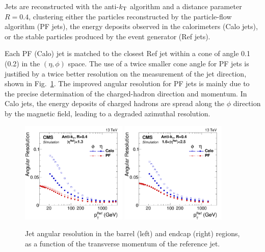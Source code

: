 Jets are reconstructed with the anti-$k_{\mathrm{T}}$ algorithm
\cite{antikt,fastjet} and a distance parameter $R=0.4$, clustering either the particles reconstructed by the
particle-flow algorithm (PF jets), the energy deposits observed in the
calorimeters (Calo jets), or the stable particles produced by the
event generator (Ref jets).

Each PF (Calo) jet is matched to the closest Ref jet within a cone of
angle 0.1 (0.2) in the $(\eta, \phi)$ space. The use of a twice
smaller cone angle for PF jets is justified by a twice better
resolution on the measurement of the jet direction, shown in
Fig.~\ref{fig:expected_performance_jets_angular}. 
The improved angular resolution for PF jets is mainly due
to the precise determination of the charged-hadron direction and
momentum. In Calo jets, the energy deposits of charged hadrons are spread
along the $\phi$ direction by the magnetic field, leading to a
degraded azimuthal resolution. 

\begin{figure}[htb]\centering 
\includegraphics[width=0.45\textwidth]{figs/cms/EtaPhiResVsRefPt_Barrel_AK4CaloL2L3_AK4PFL2L3_RMS_no2000.pdf} 
\includegraphics[width=0.45\textwidth]{figs/cms/EtaPhiResVsRefPt_Endcap_AK4CaloL2L3_AK4PFL2L3_RMS_no2000.pdf}
\caption{Jet angular resolution in the barrel (left) and endcap (right) regions, as a function of the transverse momentum of the reference jet.\label{fig:expected_performance_jets_angular}}
\end{figure}


